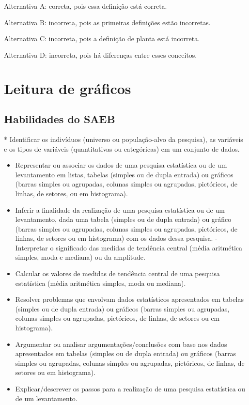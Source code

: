 Alternativa A: correta, pois essa definição está correta.

Alternativa B: incorreta, pois as primeiras definições estão incorretas.

Alternativa C: incorreta, pois a definição de planta está incorreta.

Alternativa D: incorreta, pois há diferenças entre esses conceitos.

\chapter{Leitura de gráficos}

\section{Habilidades do SAEB} * Identificar os indivíduos (universo ou
população-alvo da pesquisa), as variáveis e os tipos de variáveis
(quantitativas ou categóricas) em um conjunto de dados.

\begin{itemize}
\item
  Representar ou associar os dados de uma pesquisa estatística ou de um
  levantamento em listas, tabelas (simples ou de dupla entrada) ou
  gráficos (barras simples ou agrupadas, colunas simples ou agrupadas,
  pictóricos, de linhas, de setores, ou em histograma).
\item
  Inferir a finalidade da realização de uma pesquisa estatística ou de
  um levantamento, dada uma tabela (simples ou de dupla entrada) ou
  gráfico (barras simples ou agrupadas, colunas simples ou agrupadas,
  pictóricos, de linhas, de setores ou em histograma) com os dados dessa
  pesquisa. - Interpretar o significado das medidas de tendência central
  (média aritmética simples, moda e mediana) ou da amplitude.
\item
  Calcular os valores de medidas de tendência central de uma pesquisa
  estatística (média aritmética simples, moda ou mediana).
\item
  Resolver problemas que envolvam dados estatísticos apresentados em
  tabelas (simples ou de dupla entrada) ou gráficos (barras simples ou
  agrupadas, colunas simples ou agrupadas, pictóricos, de linhas, de
  setores ou em histograma).
\item
  Argumentar ou analisar argumentações/conclusões com base nos dados
  apresentados em tabelas (simples ou de dupla entrada) ou gráficos
  (barras simples ou agrupadas, colunas simples ou agrupadas,
  pictóricos, de linhas, de setores ou em histograma).
\item
  Explicar/descrever os passos para a realização de uma pesquisa
  estatística ou de um levantamento.
\end{itemize}

